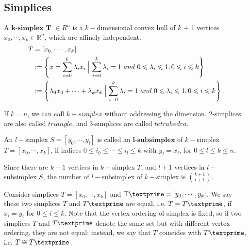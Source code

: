     \subsection{Simplices}
    \noindent
    \begin{definition*}
    A $\textbf{k-simplex T}$ $\in{R}^n$ is a ${k-}$dimensional convex hull of ${k}$ + 1 vertices ${x}_0, \cdots, {x}_k \in \mathbb{R}^n$, which are affinely independent.\\
    \begin{equation*}
    \begin{split}
    {T} & = [{x}_0, \cdots, {x}_k ]\\
    & := \left\{{x} = \sum\limits_{i=0}^k \lambda_i {x}_i \Bigm| \sum\limits_{i=0}^k \lambda_i = 1 ~and~ 0 \leqslant \lambda_i \leqslant 1, 0 \leqslant i \leqslant k \right\}\\
    & := \left\{\lambda_0{x}_0 + \cdots + \lambda_k{x}_k \Bigm| \sum\limits_{i=0}^k \lambda_i = 1 ~and~ 0 \leqslant \lambda_i \leqslant 1, 0 \leqslant i \leqslant k \right\}.
    \end{split}
    \end{equation*}
    \end{definition*}
    If ${k} = n$, we can call ${k-simplex}$ without addressing the dimension. 2-simplices are also called ${triangle}$, and 3-simplices are called ${tetrahedra}$.

    \begin{definition*}
    An ${l-}$simplex ${S} = [{y}_0, \cdots, {y}_l]$ is called an $\textbf{l-subsimplex}$ of ${k-}$simplex ${T} = [{x}_0, \cdots, {x}_k]$, if indices $0 \leqslant {i}_0 \leqslant \cdots\leqslant{i}_l \leqslant k$ with ${y}_i = {x}_i$, for $0 \leqslant l \leqslant k \leqslant n$.
    \end{definition*}
    Since there are $k+1$ vertices in ${k-}$simplex ${T}$, and $l+1$ vertices in ${l-}$subsimplex ${S}$, the number of ${l-}$subsimplex of ${k-}$simplex is $\binom{k+1}{l+1}$.


    Consider simplices ${T} = [{x}_0, \cdots, {x}_k]$ and $\text{T\textprime} = [{y}_0, \cdots, {y}_k]$. We say these two simplices ${T}$ and ${T\textprime}$ are equal, i.e. ${T} = {T\textprime}$, if ${x}_i = {y}_i$ for $0 \leqslant i \leqslant k$. Note that the vertex ordering of simplex is fixed, so if two simplices ${T}$ and ${T\textprime}$ denote the same set but with different vertex ordering, they are not equal; instead, we say that ${T}$ coincides with ${T\textprime}$, i.e. ${T} \cong {T\textprime}$.

